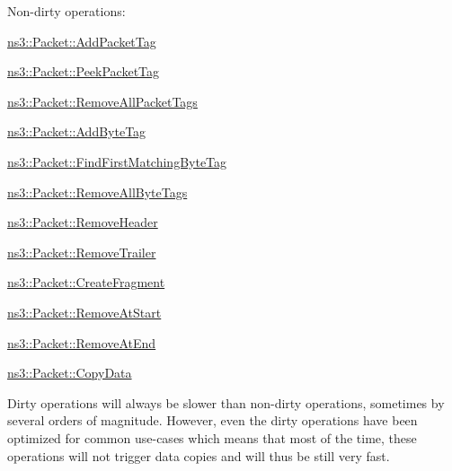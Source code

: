 Non-\/dirty operations\+:
\begin{DoxyItemize}
\item \hyperlink{classns3_1_1Packet_a7400b8655852f5271c5957250d0141af}{ns3\+::\+Packet\+::\+Add\+Packet\+Tag}
\item \hyperlink{classns3_1_1Packet_a1734de11f2ca1e78a7872461a0625168}{ns3\+::\+Packet\+::\+Peek\+Packet\+Tag}
\item \hyperlink{classns3_1_1Packet_a6c7bc5d1067c1d7fbd0fd70289182e8b}{ns3\+::\+Packet\+::\+Remove\+All\+Packet\+Tags}
\item \hyperlink{classns3_1_1Packet_ad5997caea8c22757acade2fcb4d7daca}{ns3\+::\+Packet\+::\+Add\+Byte\+Tag}
\item \hyperlink{classns3_1_1Packet_a2e1403c2411495827012fe000823c16a}{ns3\+::\+Packet\+::\+Find\+First\+Matching\+Byte\+Tag}
\item \hyperlink{classns3_1_1Packet_a083f54c9db31aeff30551a9e20fcda42}{ns3\+::\+Packet\+::\+Remove\+All\+Byte\+Tags}
\item \hyperlink{classns3_1_1Packet_a0961eccf975d75f902d40956c93ba63e}{ns3\+::\+Packet\+::\+Remove\+Header}
\item \hyperlink{classns3_1_1Packet_a2155e042083e9a17ad3b33f9fecb4be4}{ns3\+::\+Packet\+::\+Remove\+Trailer}
\item \hyperlink{classns3_1_1Packet_a16f6113606b355b2b346e2245fa2a3d0}{ns3\+::\+Packet\+::\+Create\+Fragment}
\item \hyperlink{classns3_1_1Packet_a78aa207e7921dd2f9f7e0d0b7a1c730a}{ns3\+::\+Packet\+::\+Remove\+At\+Start}
\item \hyperlink{classns3_1_1Packet_a607de6c1abda2a960e99a3b59fd35d14}{ns3\+::\+Packet\+::\+Remove\+At\+End}
\item \hyperlink{classns3_1_1Packet_a5a6d304b9e0d90733919ffe224b98f0d}{ns3\+::\+Packet\+::\+Copy\+Data}
\end{DoxyItemize}

Dirty operations will always be slower than non-\/dirty operations, sometimes by several orders of magnitude. However, even the dirty operations have been optimized for common use-\/cases which means that most of the time, these operations will not trigger data copies and will thus be still very fast. 